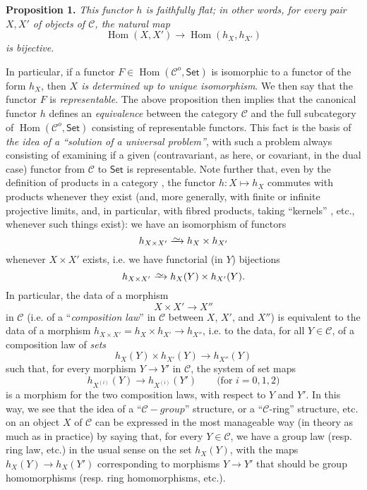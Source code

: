 \documentclass{article}
\newenvironment{itenv}[1]
  {\par\medskip\noindent\textbf{#1.}\itshape}
  {\medskip}
\renewcommand{\cal}[1]{{\mathcal{#1}}}
\newcommand{\simto}{\xrightarrow{\raisebox{-0.7ex}[0ex][0ex]{$\sim$}}}
\newcommand{\Set}{\mathsf{Set}}
\DeclareMathOperator{\Hom}{Hom}
\newcommand{\oldpage}[1]{\marginpar{\footnotesize$\Big\vert$ \textit{p.~#1}}}
\begin{document}
\begin{itenv}{Proposition 1}
\label{A.1-proposition1}
  This functor $h$ is \emph{faithfully flat};
  in other words, for every pair $X,X'$ of objects of $\cal{C}$, the natural map
  \[
    \Hom(X,X') \to \Hom(h_X,h_{X'})
  \]
  is \emph{bijective}.
\end{itenv}

In particular, if a functor $F\in\Hom(\cal{C}^o,\Set)$ is isomorphic to a functor of the form $h_X$, then \emph{$X$ is determined up to unique isomorphism}.
We then say that the functor $F$ is \emph{representable}.
The above proposition then implies that the canonical functor $h$ defines an \emph{equivalence} between the category $\cal{C}$ and the full subcategory of $\Hom(\cal{C}^o,\Set)$ consisting of representable functors.
This fact is the basis of \emph{the idea of a ``solution of a universal problem''}, with such a problem always consisting of examining if a given (contravariant, as here, or covariant, in the dual case) functor from $\cal{C}$ to $\Set$ is representable.
\oldpage{195-02}
Note further that, even by the definition of products in a category \cite{1}, the functor $h\colon X\mapsto h_X$ commutes with products whenever they exist (and, more generally, with finite or infinite projective limits, and, in particular, with fibred products, taking ``kernels'' \cite{2}, etc., whenever such things exist): we have an isomorphism of functors
\[
  h_{X\times X'} \simto h_X\times h_{X'}
\]
whenever $X\times X'$ exists, i.e. we have functorial (in $Y$) bijections
\[
  h_{X\times X'} \simto h_X(Y)\times h_{X'}(Y).
\]
In particular, the data of a morphism
\[
  X\times X' \to X''
\]
in $\cal{C}$ (i.e. of a ``\emph{composition law}'' in $\cal{C}$ between $X$, $X'$, and $X''$) is equivalent to the data of a morphism $h_{X\times X'}=h_X\times h_{X'}\to h_{X''}$, i.e. to the data, for all $Y\in\cal{C}$, of a composition law of \emph{sets}
\[
  h_X(Y)\times h_{X'}(Y) \to h_{X''}(Y)
\]
such that, for every morphism $Y\to Y'$ in $\cal{C}$, the system of set maps
\[
  h_{X^{(i)}}(Y) \to h_{X^{(i)}}(Y')
  \qquad\mbox{(for $i=0,1,2$)}
\]
is a morphism for the two composition laws, with respect to $Y$ and $Y'$.
In this way, we see that the idea of a ``$\cal{C}-group$'' structure, or a ``$\cal{C}$-ring'' structure, etc. on an object $X$ of $\cal{C}$ can be expressed in the most manageable way (in theory as much as in practice) by saying that, for every $Y\in\cal{C}$, we have a group law (resp. ring law, etc.) in the usual sense on the set $h_X(Y)$, with the maps $h_X(Y)\to h_X(Y')$ corresponding to morphisms $Y\to Y'$ that should be group homomorphisms (resp. ring homomorphisms, etc.).
\end{document}
